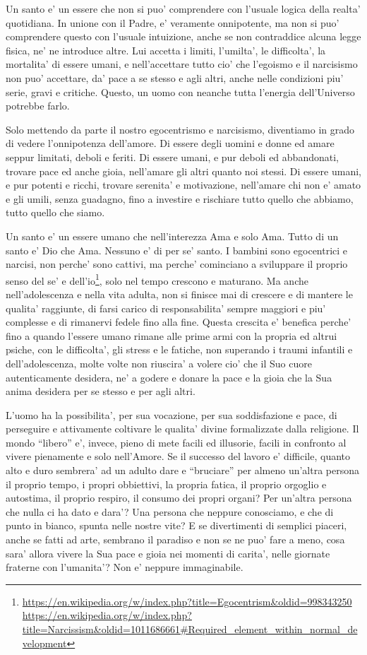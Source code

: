 Un santo e' un essere che non si puo' comprendere con l'usuale logica della realta' quotidiana. In unione con il Padre, e' veramente onnipotente, ma non si puo' comprendere questo con l'usuale intuizione, anche se non contraddice alcuna legge fisica, ne' ne introduce altre. Lui accetta i limiti, l'umilta', le difficolta', la mortalita' di essere umani, e nell'accettare tutto cio' che l'egoismo e il narcisismo non puo' accettare, da' pace a se stesso e agli altri, anche nelle condizioni piu' serie, gravi e critiche. Questo, un uomo con neanche tutta l'energia dell'Universo potrebbe farlo.

Solo mettendo da parte il nostro egocentrismo e narcisismo, diventiamo in grado di vedere l'onnipotenza dell'amore. Di essere degli uomini e donne ed amare seppur limitati, deboli e feriti. Di essere umani, e pur deboli ed abbandonati, trovare pace ed anche gioia, nell'amare gli altri quanto noi stessi. Di essere umani, e pur potenti e ricchi, trovare serenita' e motivazione, nell'amare chi non e' amato e gli umili, senza guadagno, fino a investire e rischiare tutto quello che abbiamo, tutto quello che siamo.

Un santo e' un essere umano che nell'interezza Ama e solo Ama. Tutto di un santo e' Dio che Ama. Nessuno e' di per se' santo. I bambini sono egocentrici e narcisi, non perche' sono cattivi, ma perche' cominciano a sviluppare il proprio senso del se' e dell'io\footnote{\url{https://en.wikipedia.org/w/index.php?title=Egocentrism\&oldid=998343250} \url{https://en.wikipedia.org/w/index.php?title=Narcissism\&oldid=1011686661\#Required\_element\_within\_normal\_development}}, solo nel tempo crescono e maturano.  Ma anche nell'adolescenza e nella vita adulta, non si finisce mai di crescere e di mantere le qualita' raggiunte, di farsi carico di responsabilita' sempre maggiori e piu' complesse e di rimanervi fedele fino alla fine. Questa crescita e' benefica perche' fino a quando l'essere umano rimane alle prime armi con la propria ed altrui psiche, con le difficolta', gli stress e le fatiche, non superando i traumi infantili e dell'adolescenza, molte volte non riuscira' a volere cio' che il Suo cuore autenticamente desidera, ne' a godere e donare la pace e la gioia che la Sua anima desidera per se stesso e per agli altri.

L'uomo ha la possibilita', per sua vocazione, per sua soddisfazione e pace, di perseguire e attivamente coltivare le qualita' divine formalizzate dalla religione. 
Il mondo ``libero'' e', invece, pieno di mete facili ed illusorie, facili in confronto al vivere pienamente e solo nell'Amore. Se il successo del lavoro e' difficile, quanto alto e duro sembrera' ad un adulto dare e ``bruciare'' per almeno un'altra persona il proprio tempo, i propri obbiettivi, la propria fatica, il proprio orgoglio e autostima, il proprio respiro, il consumo dei propri organi? Per un'altra persona che nulla ci ha dato e dara'? Una persona che neppure conosciamo, e che di punto in bianco, spunta nelle nostre vite? E se divertimenti di semplici piaceri, anche se fatti ad arte, sembrano il paradiso e non se ne puo' fare a meno, cosa sara' allora vivere la Sua pace e gioia nei momenti di carita', nelle giornate fraterne con l'umanita'? Non e' neppure immaginabile. 

